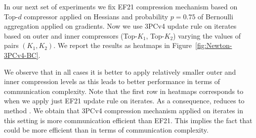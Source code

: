 \documentclass[11pt]{article}
\begin{document}
	In our next set of experiments we fix EF21 compression mechanism based on Top-$d$ compressor applied on Hessians and probability $p=0.75$ of Bernoulli aggregation applied on gradients. Now we use 3PCv4 update rule on iterates based on outer and inner compressors (Top-$K_1$, Top-$K_2$) varying the values of pairs $(K_1, K_2)$. We report the results as heatmaps in Figure~\ref{fig:Newton-3PCv4-BC}.
	
	
	We observe that in all cases it is better to apply relatively smaller outer and inner compression levels as this leads to better performance in terms of communication complexity. Note that the first row in heatmaps corresponds to  when we apply just EF21 update rule on iterates. As a consequence,  reduces to  method \citep{FedNL2021}. We obtain that 3PCv4 compression mechanism applied on iterates in this setting is more communication efficient than EF21. This implies the fact that  could be more efficient than  in terms of communication complexity.
	
\end{document}
